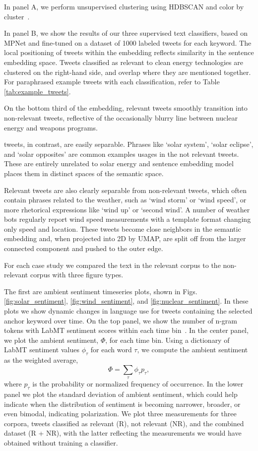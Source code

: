 In panel A, we perform unsupervised clustering using HDBSCAN and color by cluster~\cite{mcinnes2017hdbscan}. 

In panel B, we show the results of our three supervised text classifiers, based on MPNet and fine-tuned on a dataset of 1000 labeled tweets for each keyword.
The local positioning of tweets within the embedding reflects similarity in the sentence embedding space.
Tweets classified as relevant to clean energy technologies are clustered on the right-hand side, and overlap where they are mentioned together.
For paraphrased example tweets with each classification, refer to Table \ref{tab:example_tweets}.

On the bottom third of the embedding, relevant  tweets smoothly transition into non-relevant tweets, reflective of the occasionally blurry line between nuclear energy and weapons programs.

 tweets, in contrast, are easily separable. Phrases like `solar system', `solar eclipse', and `solar opposites' are common examples usages in the not relevant tweets. These are entirely unrelated to solar energy and sentence embedding model places them in distinct spaces of the semantic space.

Relevant  tweets are also clearly separable from non-relevant tweets,
which often contain phrases related to the weather,
such as `wind storm' or `wind speed',
or more rhetorical expressions like `wind up' or `second wind'.
A number of weather bots regularly report wind speed measurements with a template format changing only speed and location. 
These tweets become close neighbors in the semantic embedding and, when projected into 2D by UMAP, are split off from the larger connected component and pushed to the outer edge. 



For each case study we compared the text in the relevant corpus to the non-relevant corpus with three figure types. 

The first are ambient sentiment timeseries plots, shown in Figs. \ref{fig:solar_sentiment}, \ref{fig:wind_sentiment}, and \ref{fig:nuclear_sentiment}.
In these plots we show dynamic changes in language use for tweets containing the selected anchor keyword over time.
On the top panel, we show the number of n-gram tokens with LabMT sentiment scores within each time bin~\cite{dodds2011temporal}.
In the center panel, we plot the ambient sentiment, $\Phi$, for each time bin. 
Using a dictionary of LabMT sentiment values $\phi_{\tau}$ for each word $\tau$,
we compute the ambient sentiment as the weighted average, 
$$\Phi = \sum_{\tau} \phi_{\tau}p_{\tau},$$
where $p_\tau$ is the probability or normalized frequency of occurrence. 
In the lower panel we plot the standard deviation of ambient sentiment,
which could help indicate when the distribution of sentiment is becoming narrower, broader, or even bimodal,
indicating polarization.
We plot three measurements for three corpora, 
tweets classified as relevant (R), not relevant (NR), and the combined dataset (R + NR),
with the latter reflecting the measurements we would have obtained without training a classifier.


